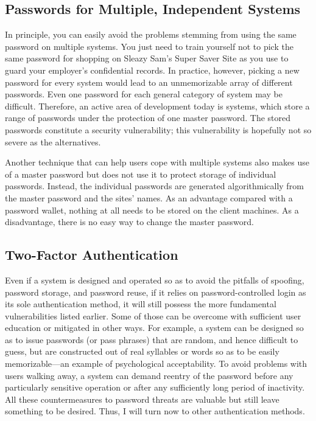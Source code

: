 \subsection{Passwords for Multiple, Independent Systems}

In principle, you can easily avoid the problems stemming from using the
same password on multiple systems.  You just need to train yourself
not to pick the same password for shopping on Sleazy Sam's Super Saver
Site as you use to guard your employer's confidential records.  In
practice, however, picking a new password for every system would lead
to an unmemorizable array of different passwords.  Even one password
for each general category of system may be difficult.  Therefore, an
active area of development today is 
systems, which store a range of passwords under the protection of one
master password.  The stored passwords constitute a security
vulnerability; this vulnerability is hopefully not so severe as the alternatives.

Another technique that can help users cope with multiple systems also
makes use of a master password but does not use it to protect storage
of individual passwords.  Instead, the individual passwords are
generated algorithmically from the master password and the sites'
names.  As an advantage compared with a password wallet, nothing at
all needs to be stored on the client machines.  As a disadvantage,
there is no easy way to change the master password.

\subsection{Two-Factor Authentication}\label{two-factor-section}

Even if a system is designed and operated so as to avoid the pitfalls
of spoofing, password storage, and password reuse, if it relies on
password-controlled login as its sole authentication method, it will
still possess the more fundamental vulnerabilities listed earlier.
Some of those can be overcome with sufficient user education or
mitigated in other ways.  For example, a system can be designed so as
to issue passwords (or pass phrases) that are random, and hence
difficult to guess, but are constructed out of real syllables or
words so as to be easily memorizable---an example of psychological acceptability.  To avoid problems with users
walking away, a system can demand reentry of the password before any
particularly sensitive operation or after any sufficiently long
period of inactivity.  All these countermeasures to password threats
are valuable but still leave something to be desired.  Thus, I will
turn now to other authentication methods.

